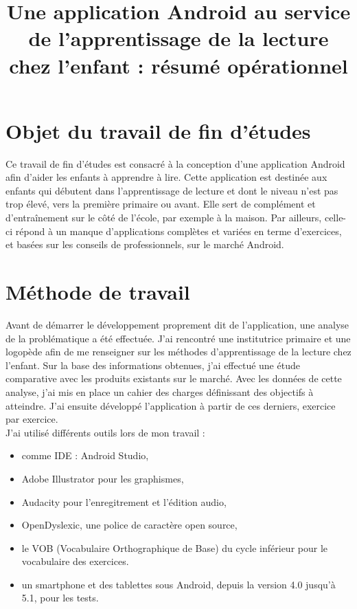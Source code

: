 \documentclass[11pt]{article}
\title{
\vspace{-2cm}
\parbox{15cm}
{	\vspace{0.5cm}
	\begin{center}\sf\bfseries
		Une application Android au service de l'apprentissage de la lecture chez l'enfant : résumé opérationnel
	\end{center}
	\vspace{-2cm}
}}
\begin{document}
\date{}
\maketitle
\thispagestyle{fancy}
\section{Objet du travail de fin d'études}
Ce travail de fin d'études est consacré à la conception d'une application Android afin d'aider les enfants à apprendre à lire. Cette application est destinée aux enfants qui débutent dans l'apprentissage de lecture et dont le niveau n'est pas trop élevé, vers la première primaire ou avant. Elle sert de complément et d'entraînement sur le côté de l'école, par exemple à la maison. Par ailleurs, celle-ci répond à un manque d'applications complètes et variées en terme d'exercices, et basées sur les conseils de professionnels, sur le marché Android.

\section{Méthode de travail}
Avant de démarrer le développement proprement dit de l'application, une analyse de la problématique a été effectuée. J'ai rencontré une institutrice primaire et une logopède afin de me renseigner sur les méthodes d'apprentissage de la lecture chez l'enfant. Sur la base des informations obtenues, j'ai effectué une étude comparative avec les produits existants sur le marché. Avec les données de cette analyse, j'ai mis en place un cahier des charges définissant des objectifs à atteindre. J'ai ensuite développé l'application à partir de ces derniers, exercice par exercice.\\

J'ai utilisé différents outils lors de mon travail :
\begin{itemize}
\item comme IDE : Android Studio,
\item Adobe Illustrator pour les graphismes,
\item Audacity pour l'enregitrement et l'édition audio, 
\item OpenDyslexic, une police de caractère open source,
\item le VOB (Vocabulaire Orthographique de Base) du cycle inférieur pour le vocabulaire des exercices.
\item un smartphone et des tablettes sous Android, depuis la version 4.0 jusqu'à 5.1, pour les tests.
\end{itemize}
\end{document}
